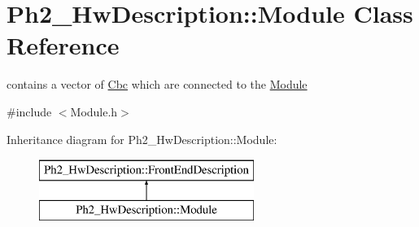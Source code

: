 \hypertarget{class_ph2___hw_description_1_1_module}{\section{Ph2\-\_\-\-Hw\-Description\-:\-:Module Class Reference}
\label{class_ph2___hw_description_1_1_module}
}


contains a vector of \hyperlink{class_ph2___hw_description_1_1_cbc}{Cbc} which are connected to the \hyperlink{class_ph2___hw_description_1_1_module}{Module}  




{\ttfamily \#include $<$Module.\-h$>$}

Inheritance diagram for Ph2\-\_\-\-Hw\-Description\-:\-:Module\-:\begin{figure}[H]
\begin{center}
\leavevmode
\includegraphics[height=2.000000cm]{class_ph2___hw_description_1_1_module}
\end{center}
\end{figure}
